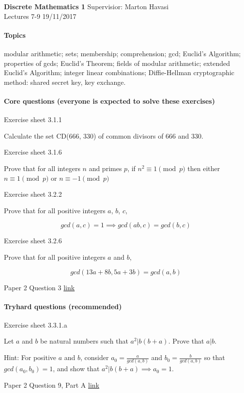 \documentclass{exam}
\begin{document}
\noindent
\large\textbf{Discrete Mathematics 1} \hfill Supervisior: Marton Havasi \\
\normalsize Lectures 7-9 \hfill 19/11/2017
\paragraph{Topics}

modular arithmetic; sets; membership; comprehension; gcd; Euclid's Algorithm; properties of gcds; Euclid's Theorem; fields of modular arithmetic; extended Euclid's Algorithm; integer linear combinations; Diffie-Hellman cryptographic method: shared secret key, key exchange.

\paragraph{Core questions (everyone is expected to solve these exercises)}
\begin{questions}
\question Exercise sheet 3.1.1

Calculate the set CD(666, 330) of common divisors of 666 and 330.

\question Exercise sheet 3.1.6

 Prove that for all integers $n$ and primes $p$, if $n^2 \equiv 1 \pmod{p}$ then either $n \equiv 1 \pmod{p}$ or $n \equiv -1 \pmod{p}$
 
\question Exercise sheet 3.2.2

Prove that for all positive integers $a$, $b$, $c$,

$$gcd(a, c) = 1 \implies gcd(a  b, c) = gcd(b, c)$$

\question Exercise sheet 3.2.6

Prove that for all positive integers $a$ and $b$,

$$gcd(13a + 8b , 5a + 3b)=gcd(a, b)$$ 


 Paper 2 Question 3 \href{http://www.cl.cam.ac.uk/teaching/exams/pastpapers/y2007p2q3.pdf}{link}

\end{questions}

\paragraph{Tryhard questions (recommended)}
\begin{questions}
\question Exercise sheet 3.3.1.a

 Let $a$ and $b$ be natural numbers such that $a^2 | b(b + a)$. Prove that $a | b$.
 
Hint: For positive $a$ and $b$, consider $a_0 =\frac{a}{gcd(a,b)}$ and $b_0 = \frac{b}{gcd(a,b)}$ so that $gcd(a_0, b_0) = 1$, and show
that $a^2| b(b + a) \implies a_0 = 1$. 
 
  Paper 2 Question 9, Part A \href{http://www.cl.cam.ac.uk/teaching/exams/pastpapers/y2015p2q9.pdf}{link}

\end{questions}
\end{document}
